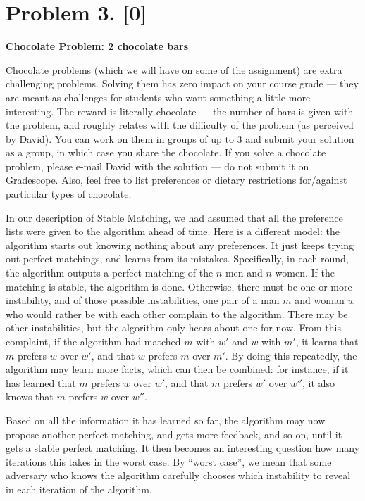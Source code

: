 \documentclass[10pt]{article}
\begin{document}
\section*{Problem 3. [0]}

\textbf{Chocolate Problem: 2 chocolate bars}

Chocolate problems (which we will have on some of the assignment) are extra challenging problems. Solving them has zero impact on your course grade --- they are meant as challenges for students who want something a little more interesting. The reward is literally chocolate --- the number of bars is given with the problem, and roughly relates with the difficulty of the problem (as perceived by David).
You can work on them in groups of up to 3 and submit your solution as a group, in which case you share the chocolate.
If you solve a chocolate problem, please e-mail David with the solution --- do not submit it on Gradescope. Also, feel free to list preferences or dietary restrictions for/against particular types of chocolate.

In our description of Stable Matching, we had assumed that all the preference lists were given to the algorithm ahead of time. Here is a different model: the algorithm starts out knowing nothing about any preferences. It just keeps trying out perfect matchings, and learns from its mistakes.
Specifically, in each round, the algorithm outputs a perfect matching of the $n$ men and $n$ women. If the matching is stable, the algorithm is done.
Otherwise, there must be one or more instability, and of those possible instabilities, one pair of a man $m$ and woman $w$ who would rather be with each other complain to the algorithm. There may be other instabilities, but the algorithm only hears about one for now.
From this complaint, if the algorithm had matched $m$ with $w'$ and $w$ with $m'$, it learns that $m$ prefers $w$ over $w'$, and that $w$ prefers $m$ over $m'$. By doing this repeatedly, the algorithm may learn more facts, which can then be combined: for instance, if it has learned that $m$ prefers $w$ over $w'$, and that $m$ prefers $w'$ over $w''$, it also knows that $m$ prefers $w$ over $w''$.

Based on all the information it has learned so far, the algorithm may now propose another perfect matching, and gets more feedback, and so on, until it gets a stable perfect matching.
It then becomes an interesting question how many iterations this takes in the worst case. By ``worst case'', we mean that some adversary who knows the algorithm carefully chooses which instability to reveal in each iteration of the algorithm.
\end{document}

